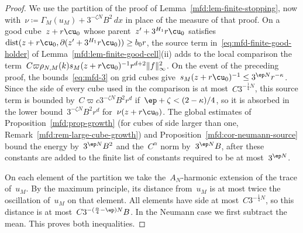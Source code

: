 \documentclass[11pt]{amsart}
\begin{document}
\begin{proof}
We use the partition of the proof of Lemma~\ref{mfd:lem-finite-stopping}, now with~$\nu\coloneqq\Gamma_M(u_M)+3^{-\zeta N}B^2\,dx$ in place of the measure of that proof. On a good cube~$z+r\cu_0$ whose parent~$z'+3^{H_1}r\cu_0$ satisfies~$\operatorname{dist}(z+r\cu_0,\partial(z'+3^{H_1}r\cu_0))\geq b_0r$, the source term in~\eqref{eq:mfd-finite-good-holder} of Lemma~\ref{mfd:lem-finite-good-cell}(ii) adds to the local comparison the term~$C\varpi \rho_{N,M}(k)s_M(z+r\cu_0)^{-1}r^{d+2}\|f\|_\infty^2$. On the event of the preceding proof, the bounds~\eqref{eq:mfd-3} on grid cubes give~$s_M(z+r\cu_0)^{-1}\leq3^{\ep N}r^{-\kappa}$. Since the side of every cube used in the comparison is at most~$C3^{-\frac14N}$, this source term is bounded by~$C\varpi c3^{-\zeta N}B^2r^d$ if~$\ep+\zeta<(2-\kappa)/4$, so it is absorbed in the lower bound~$3^{-\zeta N}B^2r^d$ for~$\nu(z+r\cu_0)$. The global estimates of Proposition~\ref{mfd:prop-growth} (for cubes of side larger than one, Remark~\ref{mfd:rem-large-cube-growth}) and Proposition~\ref{mfd:cor-neumann-source} bound the energy by~$3^{\ep N}B^2$ and the~$C^\alpha$ norm by~$3^{\ep N}B$, after these constants are added to the finite list of constants required to be at most~$3^{\ep N}$.

\smallskip

On each element of the partition we take the~$A_N$-harmonic extension of the trace of~$u_M$. By the maximum principle, its distance from~$u_M$ is at most twice the oscillation of~$u_M$ on that element. All elements have side at most~$C3^{-\frac14N}$, so this distance is at most~$C3^{-(\frac{\alpha}{4}-\ep)N}B$. In the Neumann case we first subtract the mean. This proves both inequalities.

\smallskip


\end{proof}
\end{document}

